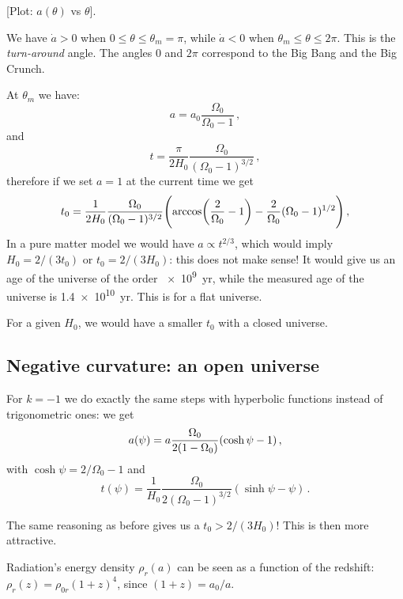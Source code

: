 \documentclass[main.tex]{subfiles}
\begin{document}
[Plot: \(a(\theta )\) vs \(\theta \)].

We have \(\dot{a} > 0 \)   when \(0 \leq \theta \leq \theta_m = \pi \), while \(\dot{a} < 0\) when \(\theta _m \leq \theta \leq 2 \pi \).
This is the \emph{turn-around} angle. The angles \(0\) and \(2 \pi \) correspond to the Big Bang and the Big Crunch.

At \(\theta _m\) we have: 
%
\begin{equation}
  a = a_0 \frac{\Omega_0}{\Omega_0 -1} 
\,,
\end{equation}
%
and 
%
\begin{equation}
  t = \frac{\pi}{2 H_0 } \frac{\Omega_0}{(\Omega_0 -1)^{3/2}}
\,,
\end{equation}
%
therefore if we set \(a=1\) at the current time we get 
%
\begin{equation}
  t_0 = \frac{1}{2H_0 } \frac{\Omega_0  }{(\Omega_0 -1)^{3/2}} \qty(\arccos (\frac{2}{\Omega_0 }-1) - \frac{2}{\Omega_0 } (\Omega_0 -1 )^{1/2})
\,,
\end{equation}
%
In a pure matter model we would have \(a \propto t^{2/3}\), which would imply \(H_0 = 2/(3 t_0 )\) or \(t_0 = 2 / (3 H_0 )\): this does not make sense! It would give us an age of the universe of the order \SI{e9}{yr}, while the measured age of the universe is \SI{1.4e10}{yr}.
This is for a flat universe.

For a given \(H_0 \), we would have a smaller \(t_0 \) with a closed universe.

\subsection{Negative curvature: an open universe}

For \(k = -1\) we do exactly the same steps with hyperbolic functions instead of trigonometric ones: we get 
%
\begin{equation}
  a ( \psi ) = a \frac{\Omega_0 }{2 (1-\Omega_0)} \qty(\cosh \psi -1)
\,,
\end{equation}
%
with \(\cosh\psi = 2/\Omega_0 -1\) and 
%
\begin{equation}
  t (\psi ) =  \frac{1}{H_0 } \frac{\Omega_0}{2 (\Omega_0 -1)^{3/2}}(\sinh \psi - \psi  )
\,.
\end{equation}
%

The same reasoning as before gives us a \(t_0 > 2 / (3 H_0 )\)! This is then more attractive.

Radiation's energy density \(\rho _r (a)\) can be seen as a function of the redshift: \(\rho _r (z ) = \rho _{0r} (1+z)^{4}\), since \((1+z) = a_0 / a\).
\end{document}
